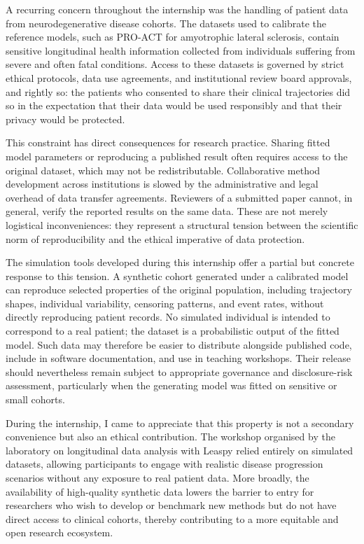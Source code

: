 \documentclass{rapportCS}
\begin{document}
A recurring concern throughout the internship was the handling of patient data from neurodegenerative disease cohorts. The datasets used to calibrate the reference models, such as PRO-ACT for amyotrophic lateral sclerosis, contain sensitive longitudinal health information collected from individuals suffering from severe and often fatal conditions. Access to these datasets is governed by strict ethical protocols, data use agreements, and institutional review board approvals, and rightly so: the patients who consented to share their clinical trajectories did so in the expectation that their data would be used responsibly and that their privacy would be protected.

This constraint has direct consequences for research practice. Sharing fitted model parameters or reproducing a published result often requires access to the original dataset, which may not be redistributable. Collaborative method development across institutions is slowed by the administrative and legal overhead of data transfer agreements. Reviewers of a submitted paper cannot, in general, verify the reported results on the same data. These are not merely logistical inconveniences: they represent a structural tension between the scientific norm of reproducibility and the ethical imperative of data protection.

The simulation tools developed during this internship offer a partial but concrete response to this tension. A synthetic cohort generated under a calibrated model can reproduce selected properties of the original population, including trajectory shapes, individual variability, censoring patterns, and event rates, without directly reproducing patient records. No simulated individual is intended to correspond to a real patient; the dataset is a probabilistic output of the fitted model. Such data may therefore be easier to distribute alongside published code, include in software documentation, and use in teaching workshops. Their release should nevertheless remain subject to appropriate governance and disclosure-risk assessment, particularly when the generating model was fitted on sensitive or small cohorts.

During the internship, I came to appreciate that this property is not a secondary convenience but also an ethical contribution. The workshop organised by the laboratory on longitudinal data analysis with Leaspy relied entirely on simulated datasets, allowing participants to engage with realistic disease progression scenarios without any exposure to real patient data. More broadly, the availability of high-quality synthetic data lowers the barrier to entry for researchers who wish to develop or benchmark new methods but do not have direct access to clinical cohorts, thereby contributing to a more equitable and open research ecosystem.
\end{document}
